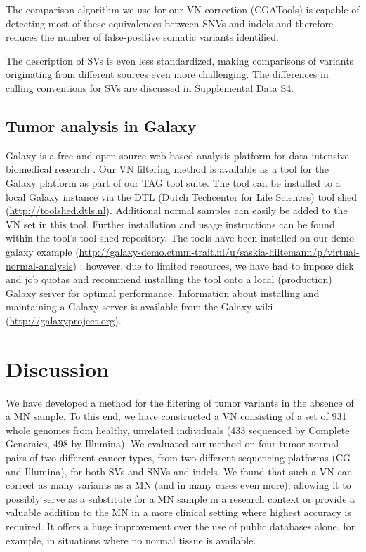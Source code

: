 The comparison algorithm we use for our VN correction (CGATools) is capable of detecting most of these equivalences between SNVs and indels and therefore reduces the number of false-positive somatic variants identified.

The description of SVs is even less standardized, making comparisons of variants originating from different sources even more challenging. The differences in calling conventions for SVs are discussed in \href{https://genome.cshlp.org/content/25/9/1382/suppl/DC1}{Supplemental Data S4}.

\subsection*{Tumor analysis in Galaxy}

Galaxy is a free and open-source web-based analysis platform for data intensive biomedical research \cite{giardine2005galaxy,blankenberg2010galaxy2,goecks2010galaxy}. Our VN filtering method is available as a tool for the Galaxy platform as part of our TAG tool suite. The tool can be installed to a local Galaxy instance via the DTL (Dutch Techcenter for Life Sciences) tool shed (\url{http://toolshed.dtls.nl}). Additional normal samples can easily be added to the VN set in this tool. Further installation and usage instructions can be found within the tool's tool shed repository. The tools have been installed on our demo galaxy example (\url{http://galaxy-demo.ctmm-trait.nl/u/saskia-hiltemann/p/virtual-normal-analysis}) \cite{hiltemann2014cgtag}; however, due to limited resources, we have had to impose disk and job quotas and recommend installing the tool onto a local (production) Galaxy server for optimal performance. Information about installing and maintaining a Galaxy server is available from the Galaxy wiki (\url{http://galaxyproject.org}).

\section*{Discussion}

We have developed a method for the filtering of tumor variants in the absence of a MN sample. To this end, we have constructed a VN consisting of a set of 931 whole genomes from healthy, unrelated individuals (433 sequenced by Complete Genomics, 498 by Illumina). We evaluated our method on four tumor-normal pairs of two different cancer types, from two different sequencing platforms (CG and Illumina), for both SVs and SNVs and indels. We found that such a VN can correct as many variants as a MN (and in many cases even more), allowing it to possibly serve as a substitute for a MN sample in a research context or provide a valuable addition to the MN in a more clinical setting where highest accuracy is required. It offers a huge improvement over the use of public databases alone, for example, in situations where no normal tissue is available.

